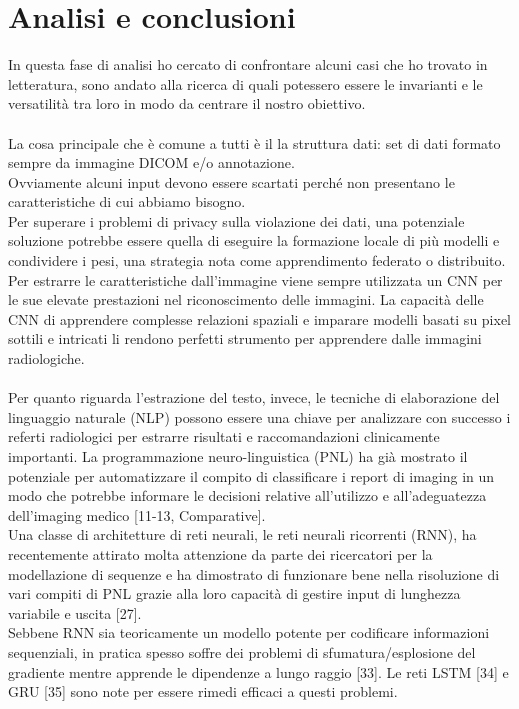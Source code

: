 \documentclass[12pt,a4paper]{report}
\begin{document}
\section{Analisi e conclusioni}
In questa fase di analisi ho cercato di confrontare alcuni casi che ho trovato in letteratura, sono andato alla ricerca di quali potessero essere le invarianti e le versatilità tra loro in modo da centrare il nostro obiettivo.\\
\\
La cosa principale che è comune a tutti è il la struttura dati: set di dati formato sempre  da immagine DICOM e/o annotazione.\\
Ovviamente alcuni input devono essere scartati perché non presentano le caratteristiche di cui abbiamo bisogno.\\
Per superare i problemi di privacy sulla violazione dei dati, una potenziale soluzione potrebbe essere quella di eseguire la formazione locale di più modelli e condividere i pesi, una strategia nota come apprendimento federato o distribuito.
Per estrarre le caratteristiche dall’immagine viene sempre utilizzata un CNN per le sue elevate prestazioni nel riconoscimento delle immagini. La capacità delle CNN di apprendere complesse relazioni spaziali e
imparare modelli basati su pixel sottili e intricati li rendono perfetti strumento per apprendere dalle immagini radiologiche. \\
\\
Per quanto riguarda l'estrazione del testo, invece, le tecniche di elaborazione del linguaggio naturale (NLP) possono essere una chiave per analizzare con successo i referti radiologici per estrarre risultati e raccomandazioni clinicamente importanti. La programmazione neuro-linguistica (PNL) ha già mostrato il potenziale per automatizzare il compito di classificare i report di imaging in un modo che potrebbe informare le decisioni relative all'utilizzo e all'adeguatezza dell'imaging medico [11-13, Comparative].\\
Una classe di architetture di reti neurali, le reti neurali ricorrenti (RNN), ha recentemente attirato molta attenzione da parte dei ricercatori per la modellazione di sequenze e ha dimostrato di funzionare bene nella risoluzione di vari compiti di PNL grazie alla loro capacità di gestire input di lunghezza variabile e uscita [27].\\
Sebbene RNN sia teoricamente un modello potente per codificare informazioni sequenziali, in pratica spesso soffre dei problemi di sfumatura/esplosione del gradiente mentre apprende le dipendenze a lungo raggio [33]. Le reti LSTM [34] e GRU [35] sono note per essere rimedi efficaci a questi problemi.\\
\end{document}
